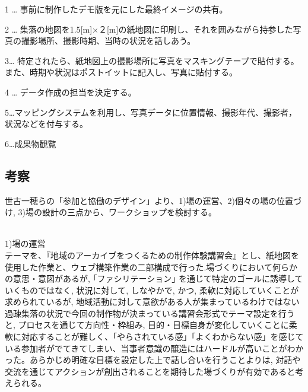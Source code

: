 \documentclass[a4paper]{jsarticle}
\begin{document}
\item 1 … 事前に制作したデモ版を元にした最終イメージの共有。
\item 2 … 集落の地図を1.5[m]×２[m]の紙地図に印刷し、それを囲みながら持参した写真の撮影場所、撮影時期、当時の状況を話しあう。


\item 3… 特定されたら、紙地図上の撮影場所に写真をマスキングテープで貼付する。また、時期や状況はポストイットに記入し、写真に貼付する。

\item 4 … データ作成の担当を決定する。

\item 5…マッピングシステムを利用し、写真データに位置情報、撮影年代、撮影者，状況などを付与する。
\item 6…成果物観覧
\subsection{考察}
世古一穂らの「参加と協働のデザイン」より、1)場の運営、2)個々の場の位置づけ, 3)場の設計の三点から、ワークショップを検討する。\\\\
\item 1)場の運営\\
テーマを、『地域のアーカイブをつくるための制作体験講習会』とし、紙地図を使用した作業と、ウェブ構築作業の二部構成で行った.場づくりにおいて何らかの意思・意図があるが, ｢ファシリテーション｣ を通じて特定のゴールに誘導していくものではなく, 状況に対して, しなやかで, かつ, 柔軟に対応していくことが求められているが, 地域活動に対して意欲がある人が集まっているわけではない過疎集落の状況で今回の制作物が決まっている講習会形式でテーマ設定を行うと,  プロセスを通じて方向性・枠組み, 目的・目標自身が変化していくことに柔軟に対応することが難しく、「やらされている感」「よくわからない感」を感じている参加者がでてきてしまい、当事者意識の醸造にはハードルが高いことがわかった。あらかじめ明確な目標を設定した上で話し合いを行うことよりは, 対話や交流を通じてアクションが創出されることを期待した場づくりが有効であると考えられる。\\
\end{document}
